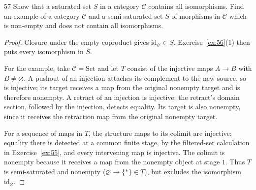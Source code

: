 \begin{exercise}{57}
Show that a saturated set $S$ in a category $\mathcal C$ contains all isomorphisms. Find an
example of a category $\mathcal C$ and a semi-saturated set $S$ of morphisms in $\mathcal C$ which is non-empty
and does not contain all isomorphisms.

\begin{proof}
Closure under the empty coproduct gives
$\mathrm{id}_{\varnothing}\in S$.
Exercise~\ref{ex:56}(1) then puts every isomorphism in $S$.

For the example, take $\mathcal C=\mathrm{Set}$ and let $T$
consist of the injective maps $A\to B$ with $B\ne\varnothing$.
A pushout of an injection attaches its complement to the new
source, so is injective; its target receives a map from the
original nonempty target and is therefore nonempty.
A retract of an injection is injective: the retract's domain
section, followed by the injection, detects equality.
Its target is also nonempty, since it receives the retraction
map from the original nonempty target.

For a sequence of maps in $T$, the structure maps to its colimit
are injective: equality there is detected at a common finite stage,
by the filtered-set calculation in Exercise~\ref{ex:55},
and every intervening map is injective.
The colimit is nonempty because it receives a map from the
nonempty object at stage $1$.
Thus $T$ is semi-saturated and nonempty
($\varnothing\to\{*\}\in T$), but excludes the isomorphism
$\mathrm{id}_{\varnothing}$.
\end{proof}
\end{exercise}
